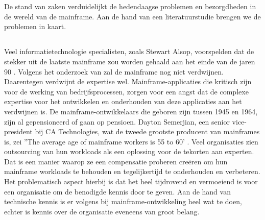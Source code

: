 \chapter{}
\label{ch:stand-van-zaken}



De stand van zaken verduidelijkt de hedendaagse problemen en bezorgdheden in de wereld van de mainframe. Aan de hand van een literatuurstudie brengen we de problemen in kaart. 

\section{}
\label{sec:Verdwijnen van expertise}

Veel informatietechnologie specialisten, zoals Stewart Alsop, voorspelden dat de stekker uit de laatste mainframe zou worden gehaald aan het einde van de jaren 90 \autocite{McCracken2012}. Volgens het onderzoek van \textcite{Waites2013} zal de mainframe nog niet verdwijnen. Daarentegen verdwijnt de expertise wel. Mainframe-applicaties die kritisch zijn voor de werking van bedrijfsprocessen, zorgen voor een angst dat de complexe expertise voor het ontwikkelen en onderhouden van deze applicaties aan het verdwijnen is. De mainframe-ontwikkelaars die geboren zijn tussen 1945 en 1964, zijn al gepensioneerd of gaan op pensioen. Dayton Semerjian, een senior vice-president bij CA Technologies, wat de tweede grootste producent van mainframes is, zei ''The average age of mainframe workers is 55 to 60' \autocite{Waites2013}. Veel organisaties zien outsourcing van hun workloads als een oplossing voor de tekorten aan experten. Dat is een manier waarop ze een compensatie proberen creëren om hun mainframe workloads te behouden en tegelijkertijd te onderhouden en verbeteren. Het problematisch aspect hierbij is dat het heel tijdrovend en vermoeiend is voor een organisatie om de benodigde kennis door te geven. Aan de hand van technische kennis is er volgens \textcite{Waites2013} bij mainframe-ontwikkeling heel wat te doen, echter is kennis over de organisatie eveneens van groot belang.

